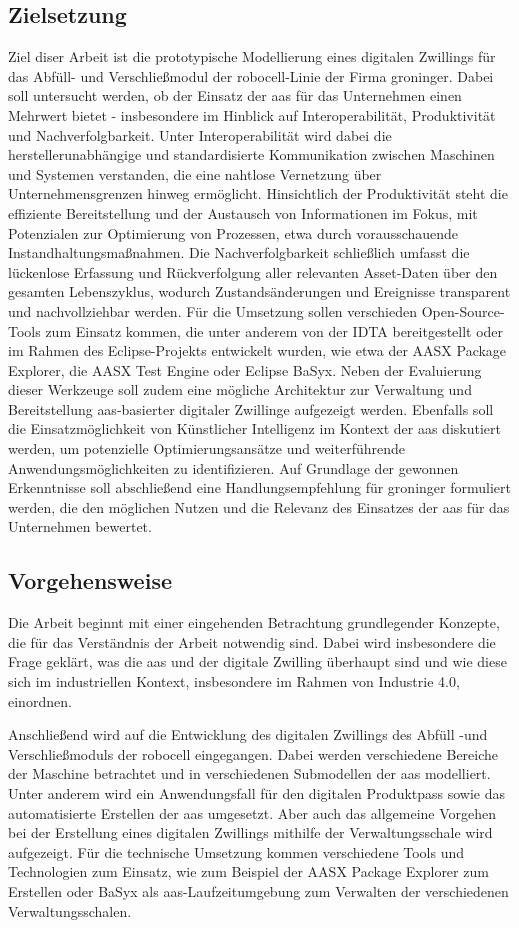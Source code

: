 \subsection{Zielsetzung}
Ziel diser Arbeit ist die prototypische Modellierung eines digitalen Zwillings für das Abfüll- und Verschließmodul der robocell-Linie der Firma groninger.
Dabei soll untersucht werden, ob der Einsatz der \acs{aas} für das Unternehmen einen Mehrwert bietet - insbesondere im Hinblick auf Interoperabilität, Produktivität und Nachverfolgbarkeit.
Unter Interoperabilität wird dabei die herstellerunabhängige und standardisierte Kommunikation zwischen Maschinen und Systemen verstanden, die eine nahtlose Vernetzung über Unternehmensgrenzen hinweg ermöglicht.
Hinsichtlich der Produktivität steht die effiziente Bereitstellung und der Austausch von Informationen im Fokus, mit Potenzialen zur Optimierung von Prozessen, etwa durch vorausschauende Instandhaltungsmaßnahmen. 
Die Nachverfolgbarkeit schließlich umfasst die lückenlose Erfassung und Rückverfolgung aller relevanten Asset-Daten über den gesamten Lebenszyklus, wodurch Zustandsänderungen und Ereignisse transparent und nachvollziehbar werden.
Für die Umsetzung sollen verschieden Open-Source-Tools zum Einsatz kommen, die unter anderem von der IDTA bereitgestellt oder im Rahmen des Eclipse-Projekts entwickelt wurden, wie etwa der AASX Package Explorer, die AASX Test Engine oder Eclipse BaSyx.
Neben der Evaluierung dieser Werkzeuge soll zudem eine mögliche Architektur zur Verwaltung und Bereitstellung \acs{aas}-basierter digitaler Zwillinge aufgezeigt werden.
Ebenfalls soll die Einsatzmöglichkeit von Künstlicher Intelligenz im Kontext der \acs{aas} diskutiert werden, um potenzielle Optimierungsansätze und weiterführende Anwendungsmöglichkeiten zu identifizieren.
Auf Grundlage der gewonnen Erkenntnisse soll abschließend eine Handlungsempfehlung für groninger formuliert werden, die den möglichen Nutzen und die Relevanz des Einsatzes der \acs{aas} für das Unternehmen bewertet.
\subsection{Vorgehensweise}
Die Arbeit beginnt mit einer eingehenden Betrachtung grundlegender Konzepte, die für das Verständnis der Arbeit notwendig sind. 
Dabei wird insbesondere die Frage geklärt, was die \acs{aas} und der digitale Zwilling überhaupt sind und wie diese sich im industriellen Kontext, insbesondere im Rahmen von Industrie 4.0, einordnen.

Anschließend wird auf die Entwicklung des digitalen Zwillings des Abfüll -und Verschließmoduls der robocell eingegangen. 
Dabei werden verschiedene Bereiche der Maschine betrachtet und in verschiedenen Submodellen der \acs{aas} modelliert.
Unter anderem wird ein Anwendungsfall für den digitalen Produktpass sowie das automatisierte Erstellen der \acs{aas} umgesetzt.
Aber auch das allgemeine Vorgehen bei der Erstellung eines digitalen Zwillings mithilfe der Verwaltungsschale wird aufgezeigt.
Für die technische Umsetzung kommen verschiedene Tools und Technologien zum Einsatz, wie zum Beispiel der AASX Package Explorer zum Erstellen oder BaSyx als \acs{aas}-Laufzeitumgebung zum Verwalten der verschiedenen Verwaltungsschalen.


